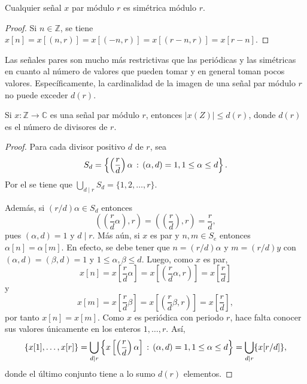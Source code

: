 \begin{proposition}
Cualquier señal $x$ par módulo $r$ es simétrica módulo $r$.
\end{proposition}

\begin{proof}
Si $n \in \mathbb{Z}$, se tiene $x[n] = x[(n,r)] = x[(-n,r)] = x[(r-n,r)] = x[r-n]$.
\end{proof}

Las señales pares son mucho más restrictivas que las periódicas y las simétricas en cuanto al número de valores que pueden tomar y en general toman pocos valores. Específicamente, la cardinalidad de la imagen de una señal par módulo $r$ no puede exceder $d(r)$.

\begin{proposition}\label{prop:fou3}
Si $x : \mathbb{Z} \longrightarrow \mathbb{C}$ es una señal par módulo $r$, entonces $| x (Z) | \le d(r)$, donde $d(r)$ es el número de divisores de $r$.
\end{proposition}

\begin{proof}
Para cada divisor positivo $d$ de $r$, sea
\begin{equation*}
    S_d = \left\{ \left( \frac{r}{d} \right) \alpha \, : \, (\alpha,d) = 1, 1 \le \alpha \le d \right\}.
\end{equation*}
Por el  se tiene que $\bigcup_{d \mid r} S_d = \{ 1,2,\ldots,r \}$.
\bigskip

Además, si $(r/d)\alpha \in S_d$ entonces
\begin{equation}\label{eq:res1}
    \left( \left( \frac{r}{d} \alpha \right),r \right) = \left( \left( \frac{r}{d} \right),r \right) = \frac{r}{d},
\end{equation}
pues $(\alpha,d)=1$ y $d \mid r$. Más aún, si $x$ es par y $n, m \in S_e$ entonces $\alpha[n]=\alpha[m]$. En efecto, se debe tener que $n = (r/d) \alpha$ y $m = (r/d) y$ con $(\alpha,d)=(\beta,d)=1$ y $1 \le \alpha,\beta \le d$. Luego, como $x$ es par,
\begin{equation*}
    x[n] = x \left[ \frac{r}{d} \alpha \right] = x \left[ \left( \frac{r}{d} \alpha, r \right) \right] = x \left[ \frac{r}{d} \right]
\end{equation*}
y
\begin{equation*}
    x[m] = x \left[ \frac{r}{d} \beta \right] = x \left[ \left( \frac{r}{d} \beta, r \right) \right] = x \left[ \frac{r}{d} \right],
\end{equation*}
por tanto $x[n]=x[m]$. Como $x$ es periódica con periodo $r$, hace falta conocer sus valores únicamente en los enteros $1,\ldots,r$. Así,
\begin{equation*}
    \{ x[1], \ldots, x[r] \} = \bigcup_{d \mid r} \left\{ x \left [\left( \frac{r}{d} \right) \alpha \right] \, : \, (\alpha,d)=1, 1 \le \alpha \le d \right\} = \bigcup_{d \mid r} \{ x[r/d] \},
\end{equation*}
donde el último conjunto tiene a lo sumo $d(r)$ elementos.
\end{proof}

